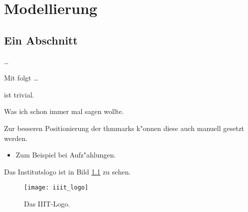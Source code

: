 
\chapter{Modellierung}
\label{ch:modellierung}
\section{Ein Abschnitt}

\begin{definition}[Operator]
    \dots{}
\end{definition}

\begin{satz}
    Mit \cite{bronstein:12} folgt \dots{}
\end{satz}

\begin{beispiel}
    ist trivial.
\end{beispiel}

\begin{bemerkung}
    Was ich schon immer mal sagen wollte.
\end{bemerkung}

\begin{definition}
    Zur besseren Positionierung der thmmarks k"onnen diese auch manuell gesetzt werden.

    \begin{itemize}
        \item Zum Beispiel bei Aufz"ahlungen. \thmmark
    \end{itemize}
\end{definition}


Das Institutslogo ist in Bild \ref{fig:iiitlogo} zu sehen.

\begin{figure}[ht]
    \centering
    \texttt{[image: iiit\_logo]}
    \caption{Das IIIT-Logo.\label{fig:iiitlogo}}
\end{figure}

